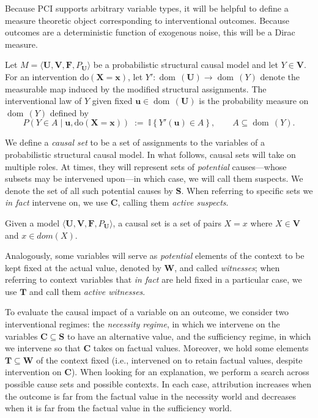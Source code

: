 \documentclass[anon,12pt]{clear2026} %
\newcommand{\ourapproach}{PCI }
\newcommand{\dom}{\operatorname{dom}\,}
\begin{document}
Because \ourapproach supports arbitrary variable types, it will be helpful to define a measure theoretic object corresponding to interventional outcomes. Because outcomes are a deterministic function of exogenous noise, this will be a Dirac measure.

\begin{definition} \label{def:interlaw}
Let $M=\langle \mathbf{U},\mathbf{V},\mathbf{F},P_{\mathbf{U}}\rangle$ be a probabilistic
structural causal model and let $Y\in\mathbf{V}$.
For an intervention $\mathrm{do}(\mathbf{X}=\mathbf{x})$, let
$Y':\dom(\mathbf{U})\to\dom(Y)$ denote the measurable map induced by the
modified structural assignments.
The interventional law of $Y$ given fixed $\mathbf{u}\in\dom(\mathbf{U})$ is the probability measure on
$\dom(Y)$ defined by
\[
P\!\left(Y\in A \mid \mathbf{u},\mathrm{do}(\mathbf{X}=\mathbf{x})\right)
\;:=\;
\mathbb{I}\!\left\{Y'(\mathbf{u})\in A\right\},
\qquad
A\subseteq\dom(Y).
\]
\end{definition}


We define a \emph{causal set} to be a set of assignments to the variables of a probabilistic structural causal model.
In what follows, causal sets will take on multiple roles. At times, they will represent sets of \emph{potential} causes---whose subsets may be intervened upon---in which case, we will call them suspects.
We denote the set of all such potential causes by $\mathbf{S}$. 
When referring to specific sets we \emph{in fact} intervene on, we use $\mathbf{C}$, calling them \emph{active suspects}.

\begin{definition}
Given a model \(\langle \mathbf{U}, \mathbf{V}, \mathbf{F}, P_{\mathbf{U}}\rangle\), a causal set is a set of pairs $X = x$ where $X \in \mathbf{V}$ and $x \in \mathit{dom}(X)$. 
\end{definition}

Analogously, some variables will serve as \emph{potential} elements of the context to be kept fixed at the actual value, denoted by $\mathbf{W}$, and called \emph{witnesses}; when referring to context variables that \emph{in fact} are held fixed in a particular case, we use $\mathbf{T}$ and call them \emph{active witnesses}.

To evaluate the causal impact of a variable on an outcome, we consider two interventional regimes: the \emph{necessity regime}, in which we intervene on the variables $\mathbf{C} \subseteq \mathbf{S}$ to have an alternative value, and the sufficiency regime, in which we intervene so that $\mathbf{C}$ takes on factual values.
Moreover, we hold some elements $\mathbf{T} \subseteq \mathbf{W}$ of the context fixed (i.e., intervened on to retain factual values, despite intervention on $\mathbf{C}$). 
When looking for an explanation, we perform a search across possible cause sets and possible contexts.
In each case, attribution increases when the outcome is far from the factual value in the necessity world and decreases when it is far from the factual value in the sufficiency world.
\end{document}
